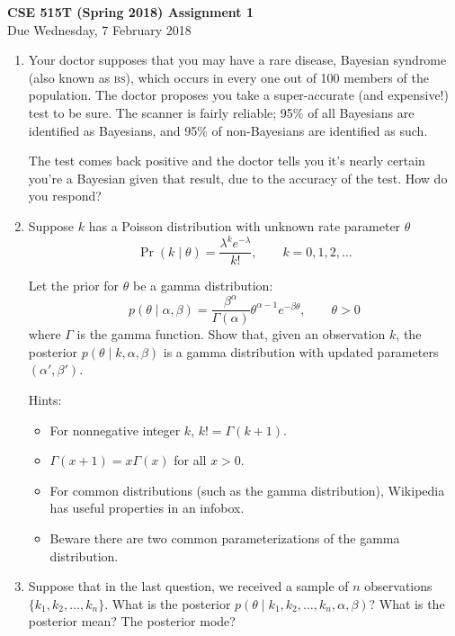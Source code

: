 \documentclass{article}
\newcommand{\acro}[1]{\textsc{\MakeLowercase{#1}}}
\newcommand{\given}{\mid}
\begin{document}
{\large \textbf{CSE 515T (Spring 2018) Assignment 1}} \\
Due Wednesday, 7 February 2018 \\

\begin{enumerate}

\item
  Your doctor supposes that you may have a rare disease, Bayesian
  syndrome (also known as \acro{BS}), which occurs in every one out of
  100 members of the population. The doctor proposes you take a
  super-accurate (and expensive!) test to be sure.  The scanner is
  fairly reliable; 95\% of all Bayesians are identified as Bayesians,
  and 95\% of non-Bayesians are identified as such.

  The test comes back positive and the doctor tells you it's nearly
  certain you're a Bayesian given that result, due to the accuracy of
  the test. How do you respond?

\item
  Suppose $k$ has a Poisson distribution with unknown rate parameter
  $\theta$
  \[
    \Pr(k \given \theta) = \frac{\lambda^k e^{-\lambda}}{k!},
    \qquad
    k = 0, 1, 2, \dotsc
  \]

  Let the prior for $\theta$ be a gamma distribution:
  \[
    p(\theta \given \alpha, \beta)
    =
    \frac{\beta^\alpha}
         {\Gamma(\alpha)}
    \theta^{\alpha - 1}e^{-\beta\theta},
    \qquad \theta > 0
  \]
  where $\Gamma$ is the gamma function.  Show that, given an
  observation $k$, the posterior $p(\theta \given k, \alpha, \beta)$
  is a gamma distribution with updated parameters $(\alpha', \beta')$.

  Hints:
  \begin{itemize}
  \item For nonnegative integer $k$, $k! = \Gamma(k + 1)$.
  \item $\Gamma(x + 1) = x\Gamma(x)$ for all $x > 0$.
  \item For common distributions (such as the gamma distribution),
    Wikipedia has useful properties in an infobox.
  \item Beware there are two common parameterizations of the gamma distribution.
  \end{itemize}

\item
  Suppose that in the last question, we received a sample of $n$
  observations $\{k_1, k_2, \dotsc, k_n\}$. What is the posterior
  $p(\theta \given k_1, k_2, \dotsc, k_n, \alpha, \beta)$? What is the
  posterior mean? The posterior mode?


\end{enumerate}
\end{document}
